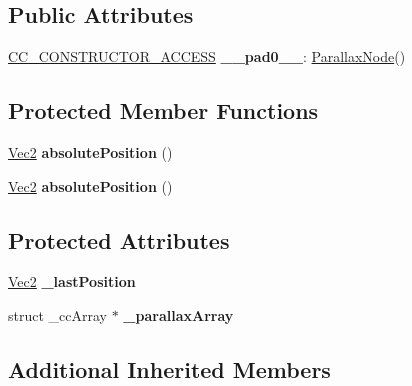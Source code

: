 \subsection*{Public Attributes}
\begin{DoxyCompactItemize}
\item 
\mbox{\label{classParallaxNode_a64a249ace0d8de930b9786b475f4dcdb}} 
\hyperlink{_2cocos2d_2cocos_2base_2ccConfig_8h_a25ef1314f97c35a2ed3d029b0ead6da0}{C\+C\+\_\+\+C\+O\+N\+S\+T\+R\+U\+C\+T\+O\+R\+\_\+\+A\+C\+C\+E\+SS} {\bfseries \+\_\+\+\_\+pad0\+\_\+\+\_\+}\+: \hyperlink{classParallaxNode}{Parallax\+Node}()
\end{DoxyCompactItemize}
\subsection*{Protected Member Functions}
\begin{DoxyCompactItemize}
\item 
\mbox{\label{classParallaxNode_a1faddc0d23a79aaf16cc1bc7656225e2}} 
\hyperlink{classVec2}{Vec2} {\bfseries absolute\+Position} ()
\item 
\mbox{\label{classParallaxNode_a1faddc0d23a79aaf16cc1bc7656225e2}} 
\hyperlink{classVec2}{Vec2} {\bfseries absolute\+Position} ()
\end{DoxyCompactItemize}
\subsection*{Protected Attributes}
\begin{DoxyCompactItemize}
\item 
\mbox{\label{classParallaxNode_aff140cec1a142699624d71f0d04abe49}} 
\hyperlink{classVec2}{Vec2} {\bfseries \+\_\+last\+Position}
\item 
\mbox{\label{classParallaxNode_acd2df3f4a0a8c7f6ef20786974a17369}} 
struct \+\_\+cc\+Array $\ast$ {\bfseries \+\_\+parallax\+Array}
\end{DoxyCompactItemize}
\subsection*{Additional Inherited Members}


